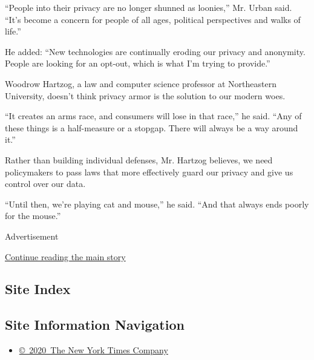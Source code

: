 ``People into their privacy are no longer shunned as loonies,'' Mr.
Urban said. ``It's become a concern for people of all ages, political
perspectives and walks of life.''

He added: ``New technologies are continually eroding our privacy and
anonymity. People are looking for an opt-out, which is what I'm trying
to provide.''

Woodrow Hartzog, a law and computer science professor at Northeastern
University, doesn't think privacy armor is the solution to our modern
woes.

``It creates an arms race, and consumers will lose in that race,'' he
said. ``Any of these things is a half-measure or a stopgap. There will
always be a way around it.''

Rather than building individual defenses, Mr. Hartzog believes, we need
policymakers to pass laws that more effectively guard our privacy and
give us control over our data.

``Until then, we're playing cat and mouse,'' he said. ``And that always
ends poorly for the mouse.''

Advertisement

\protect\hyperlink{after-bottom}{Continue reading the main story}

\hypertarget{site-index}{%
\subsection{Site Index}\label{site-index}}

\hypertarget{site-information-navigation}{%
\subsection{Site Information
Navigation}\label{site-information-navigation}}

\begin{itemize}
\tightlist
\item
  \href{https://help.nytimes3xbfgragh.onion/hc/en-us/articles/115014792127-Copyright-notice}{©~2020~The
  New York Times Company}
\end{itemize}

